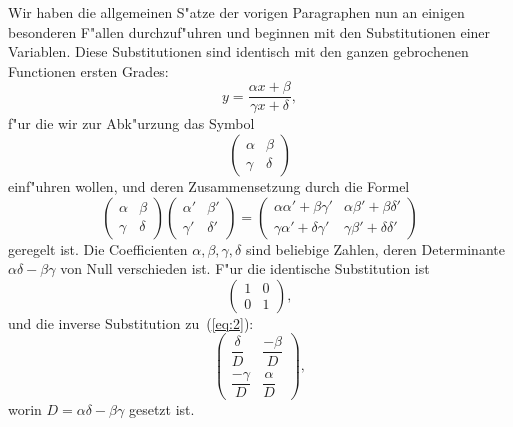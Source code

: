 \documentclass[12pt,a4paper]{article}
\theoremstyle{weber}
\begin{document}
Wir haben die allgemeinen S"atze der vorigen Paragraphen nun an einigen besonderen F"allen durchzuf"uhren und beginnen mit den Substitutionen einer Variablen. Diese Substitutionen sind identisch mit den ganzen gebrochenen Functionen ersten Grades:
\begin{equation}\label{eq:1}
y = \frac{\alpha x + \beta}{\gamma x + \delta},
\end{equation}
f"ur die wir zur Abk"urzung das Symbol
\begin{equation}\label{eq:2}
\begin{pmatrix}\alpha & \beta \\ \gamma & \delta\end{pmatrix}
\end{equation}
einf"uhren wollen, und deren Zusammensetzung durch die Formel
\begin{equation}\label{eq:3}
\begin{pmatrix}\alpha & \beta \\ \gamma & \delta\end{pmatrix}
\begin{pmatrix}\alpha' & \beta' \\ \gamma' & \delta'\end{pmatrix}
=
\begin{pmatrix}
\alpha\alpha'+\beta\gamma' & \alpha\beta'+\beta\delta' \\
\gamma\alpha'+\delta\gamma' & \gamma\beta'+\delta\delta'
\end{pmatrix}
\end{equation}
geregelt ist. Die Coefficienten $\alpha, \beta, \gamma, \delta$ sind beliebige Zahlen, deren Determinante $\alpha\delta - \beta\gamma$ von Null verschieden ist. F"ur die identische Substitution ist
\begin{equation}\label{eq:4}
\begin{pmatrix}1 & 0 \\ 0 & 1\end{pmatrix},
\end{equation}
und die inverse Substitution zu~(\ref{eq:2}):
\begin{equation}\label{eq:5}
\begin{pmatrix}\dfrac{\delta}{D} & \dfrac{-\beta}{D} \\[8pt] \dfrac{-\gamma}{D} & \dfrac{\alpha}{D}\end{pmatrix},
\end{equation}
worin $D = \alpha\delta - \beta\gamma$ gesetzt ist.
\end{document}
